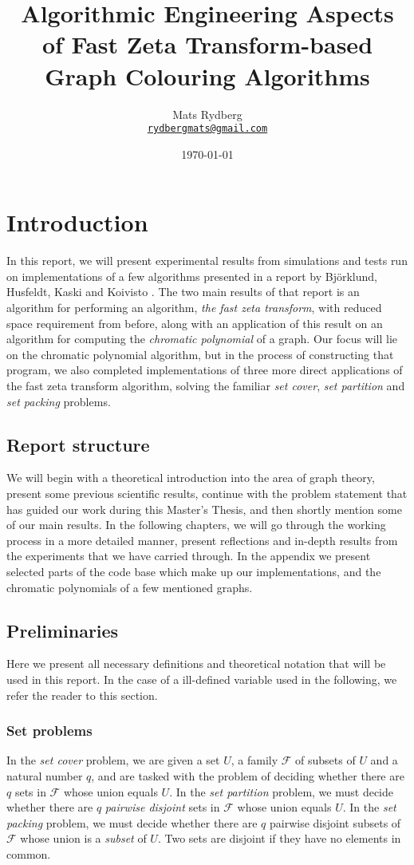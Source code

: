 \documentclass{cslthse-msc}
\title{\huge{Algorithmic Engineering Aspects of Fast Zeta Transform-based Graph Colouring Algorithms}}
\author{Mats Rydberg \\
    {\normalsize \href{mailto:rydbergmats@gmail.com}{\texttt{rydbergmats@gmail.com}}}}
\date{\today}
\begin{document}
\makefrontmatter

\chapter{Introduction}
In this report, we will present experimental results from simulations and tests run on implementations of a few algorithms presented in a report by Björklund, Husfeldt, Kaski and Koivisto \cite{cov_pack}. The two main results of that report is an algorithm for performing an algorithm, \emph{the fast zeta transform}, with reduced space requirement from before, along with an application of this result on an algorithm for computing the \emph{chromatic polynomial} of a graph. Our focus will lie on the chromatic polynomial algorithm, but in the process of constructing that program, we also completed implementations of three more direct applications of the fast zeta transform algorithm, solving the familiar \emph{set cover}, \emph{set partition} and \emph{set packing} problems.

\section{Report structure}
We will begin with a theoretical introduction into the area of graph theory, present some previous scientific results, continue with the problem statement that has guided our work during this Master's Thesis, and then shortly mention some of our main results. In the following chapters, we will go through the working process in a more detailed manner, present reflections and in-depth results from the experiments that we have carried through. In the appendix we present selected parts of the code base which make up our implementations, and the chromatic polynomials of a few mentioned graphs.

\section{Preliminaries}
Here we present all necessary definitions and theoretical notation that will be used in this report. In the case of a ill-defined variable used in the following, we refer the reader to this section.

\subsection{Set problems} \label{setproblems}
In the \emph{set cover} problem, we are given a set $U$, a family $\mathcal{F}$ of subsets of $U$ and a natural number $q$, and are tasked with the problem of deciding whether there are $q$ sets in $\mathcal{F}$ whose union equals $U$. In the \emph{set partition} problem, we must decide whether there are $q$ \emph{pairwise disjoint} sets in $\mathcal{F}$ whose union equals $U$. In the \emph{set packing} problem, we must decide whether there are $q$ pairwise disjoint subsets of $\mathcal{F}$ whose union is a \emph{subset} of $U$. Two sets are disjoint if they have no elements in common.
\end{document}
